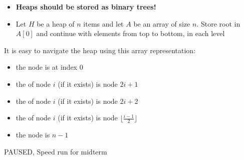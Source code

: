 \documentclass[letterpaper, 12pt]{article}
\newcommand{\red}[1]{{\color{red}{#1}}}
\begin{document}
    \textbf{\red{Storing Heaps in Arrays}}
    \begin{itemize}
        \item \textbf{Heaps should \red{not} be stored as binary trees!}
        \item Let $H$ be a heap of $n$ items and let $A$ be an array of size $n$. Store root in $A[0]$ and continue with elements 
        \red{level-by-level} from top to bottom, in each level \red{left-to-right}
    \end{itemize}
    
    It is easy to navigate the heap using this array representation:
    \begin{itemize}
        \item the \red{root} node is at index 0
        \item the \red{left child} of node $i$ (if it exists) is node $2i + 1$
        \item the \red{right child} of node $i$ (if it exists) is node $2i + 2$
        \item the \red{parent} of node $i$ (if it exists) is node $\lfloor\frac{i-1}{2}\rfloor$
        \item the \red{last} node is $n-1$
    \end{itemize}
    \pagebreak

    PAUSED, Speed run for midterm
\end{document}
